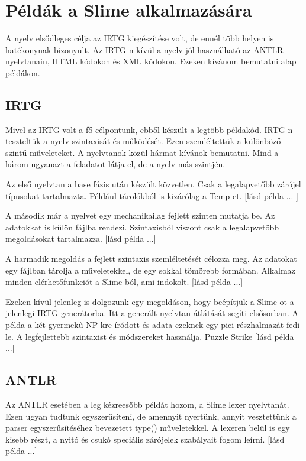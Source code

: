 {%
\section{Példák a Slime alkalmazására}

A nyelv elsődleges célja az IRTG kiegészítése volt, de ennél több helyen is hatékonynak bizonyult.
Az IRTG-n kívül a nyelv jól használható az ANTLR nyelvtanain, HTML kódokon és XML kódokon.
Ezeken kívánom bemutatni alap példákon.


\subsection{IRTG}
Mivel az IRTG volt a fő célpontunk, ebből készült a legtöbb példakód.
IRTG-n teszteltük a nyelv szintaxisát és működését.
Ezen szemléltettük a különböző szintű műveleteket.
A nyelvtanok közül hármat kívánok bemutatni.
Mind a három ugyanazt a feladatot látja el, de a nyelv más szintjén.

Az első nyelvtan a base fázis után készült közvetlen.
Csak a legalapvetőbb zárójel típusokat tartalmazta.
Például tárolókból is kizárólag a Temp-et.
[lásd példa ... ]

A második már a nyelvet egy mechanikailag fejlett szinten mutatja be.
Az adatokkat is külön fájlba rendezi.
Szintaxisból viszont csak a legalapvetőbb megoldásokat tartalmazza.
[lásd példa ...]

A harmadik megoldás a fejlett szintaxis szemléltetését célozza meg.
Az adatokat egy fájlban tárolja a műveletekkel, de egy sokkal tömörebb formában.
Alkalmaz minden elérhetőfunkciót a Slime-ból, ami indokolt.
[lásd példa ...]

Ezeken kívül jelenleg is dolgozunk egy megoldáson, hogy beépítjük a Slime-ot a jelenlegi IRTG generátorba.
Itt a generált nyelvtan átlátását segíti elsősorban.
A példa a két gyermekű NP-kre íródott és adata ezeknek egy pici részhalmazát fedi le.
A legfejlettebb szintaxist és módszereket használja. Puzzle Strike
[lásd példa ...]

\subsection{ANTLR}
Az ANTLR esetében a leg kézreesőbb példát hozom, a Slime lexer nyelvtanát. 
Ezen ugyan tudtunk egyszerűsíteni, de amennyit nyertünk, annyit vesztettünk a parser egyszerűsítéséhez bevezetett type() műveletekkel.
A lexeren belül is egy kisebb részt, a nyitó és csukó speciális zárójelek szabályait fogom leírni.
[lásd példa ...]

}
